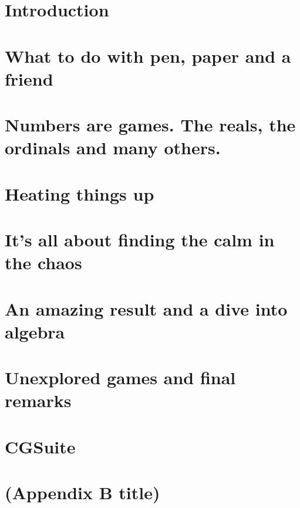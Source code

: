 \documentclass[12pt,twoside]{report}
\let\oldchapter\chapter%
\renewcommand{\chapter}{\cleardoublepage\oldchapter}%
\begin{document}
    

    

    {\hypersetup{linkcolor=black}
        \tableofcontents
        \listoffigures
    }
        {\hypersetup{linkcolor=mycolor}}
    
    \chapter{Introduction} 
    
    
    \chapter{What to do with pen, paper and a friend}
    

    \chapter{Numbers are games. The reals, the ordinals and many others.}
    
    
    \chapter{Heating things up}
    
    
    \chapter{It's all about finding the calm in the chaos}
    
    
    \chapter{An amazing result and a dive into algebra}
    
    
    \chapter{Unexplored games and final remarks}
    
    
    
    \nocite{*}
    
    
    \appendix
    \chapter{CGSuite}
    
    
     \chapter{(Appendix B title)}
    
\end{document}
